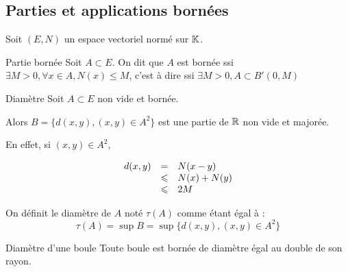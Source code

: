 \subsection{Parties et applications bornées}

Soit $(E, N)$ un espace vectoriel normé sur $\mathbb{K}$. 

\begin{definition}{Partie bornée}{}
    Soit $A \subset E$. On dit que $A$ est bornée ssi $\exists M > 0, \forall x \in A, N(x) \leqslant M$, 
    c'est à dire ssi $\exists M > 0, A \subset B'(0, M)$
\end{definition}

\begin{theoreme}{Diamètre}{}
    Soit $A \subset E$ non vide et bornée. 

    Alors $B = \{d(x, y), (x, y) \in A^2\}$ est une partie de $\mathbb{R}$ non vide et majorée.

    En effet, si $(x, y) \in A^2$, 

    \[
    \begin{array}{rcl}
        d(x, y) & = & N(x - y) \\
        \space & \leqslant & N(x) + N(y) \\
        \space & \leqslant & 2 M \\
    \end{array}
    \]

    On définit le diamètre de $A$ noté $\tau(A)$ comme étant égal à : 
    $$\tau(A) = \sup B = \sup \{d(x, y), (x, y) \in A^2\}$$
\end{theoreme}

\begin{proposition}{Diamètre d'une boule}{}
    Toute boule est bornée de diamètre égal au double de son rayon.
\end{proposition}


